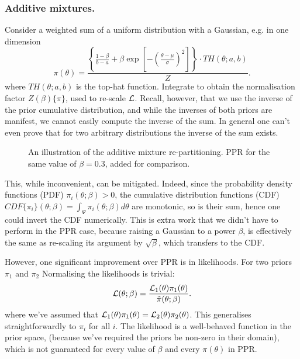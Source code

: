 \documentclass[usenatbib]{mnras}
\begin{document}
\subsubsection{Additive mixtures.}
\label{sec:org0aa08f5}
Consider a weighted sum of a uniform distribution with
a Gaussian, e.g. in one dimension
\begin{equation}\label{eq:additive-mix}
  \pi(\theta) = \dfrac{ \left\lbrace \frac{1- \beta} {b - a} + \beta \exp \left[ -\left(\frac{\theta - \mu}{\sigma} \right)^{2}\right]\right\rbrace \cdot TH(\theta; a, b)}{Z}.
\end{equation}
where \(TH(\theta;a,b)\) is the top-hat function. Integrate to
obtain the normalisation factor \(Z(\beta)\{\pi\}\), used to
re-scale \({\cal L}\). Recall, however, that we use the inverse of
the prior cumulative distribution, and while the inverses of both
priors are manifest, we cannot easily compute the inverse of the
sum. In general one can't even prove that for two arbitrary
distributions the inverse of the sum exists.

\begin{figure}
  
\caption{\label{orge7b4e75}
An illustration of the additive mixture re-partitioning. PPR for the same value of \(\beta=0.3\), added for comparison.}
\end{figure}

This, while inconvenient, can be mitigated. Indeed, since the
probability density functions (PDF) \(\pi_{i}(\theta; \beta) >0\),
the cumulative distribution functions (CDF)
\(CDF\{\pi_{i}\}(\theta;\beta) = \int_{\Psi} \pi_{i}(\theta; \beta)
	d\theta\) are monotonic, so is their sum, hence one could invert
the CDF numerically. This is extra work that we didn't have to
perform in the PPR case, because raising a Gaussian to a power
\(\beta\), is effectively the same as re-scaling its argument by
\(\sqrt{\beta}\), which transfers to the CDF.

However, one significant improvement over PPR is in
likelihoods. For two priors \(\pi_{1}\) and \(\pi_{2}\)
Normalising the likelihoods is trivial:
\begin{equation}
{\cal L}(\theta; \beta) = \frac{{\cal L}_{1}(\theta) \pi_{1}(\theta)}{\tilde{\pi}(\theta; \beta)}.
\end{equation}
where we've assumed that \({\cal L}_{1}(\theta)\pi_{1}(\theta) =
	{\cal L}_{2}(\theta) \pi_{2}(\theta)\). This generalises
straightforwardly to \(\pi_{i}\) for all \(i\). The likelihood is a
well-behaved function in the prior space, (because we've required
the priors be non-zero in their domain), which is not guaranteed 
for every value of \(\beta\) and every \(\pi(\theta)\) in PPR.
\end{document}
